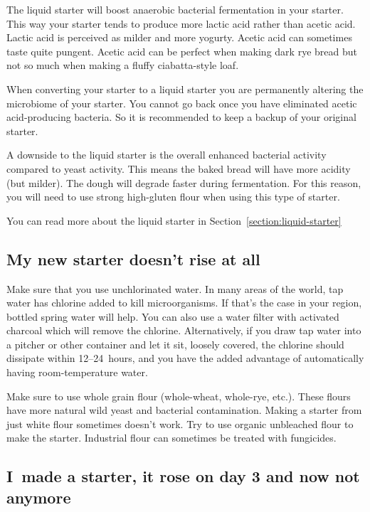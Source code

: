 The liquid starter will boost anaerobic bacterial
fermentation in your starter. This way your starter
tends to produce more lactic acid rather than acetic
acid. Lactic acid is perceived as milder and more
yogurty. Acetic acid can sometimes taste quite
pungent. Acetic acid can be perfect when making 
dark rye bread but not so much when making a fluffy
ciabatta-style loaf.

When converting your starter to a liquid starter you are
permanently altering the microbiome of your starter.
You cannot go back once you have eliminated acetic
acid-producing bacteria. So it is recommended to keep
a backup of your original starter.

A downside to the liquid starter is the overall
enhanced bacterial activity compared to yeast activity. This means the baked bread
will have more acidity (but milder). The dough will degrade
faster during fermentation. For this reason, you
will need to use strong high-gluten flour when using
this type of starter.

You can read more about the liquid starter in
Section~\ref{section:liquid-starter}

\subsection{My new starter doesn't rise at all}

Make sure that you use unchlorinated water.
In many areas of the world, tap water has
chlorine added to kill microorganisms. If that's
the case in your region, bottled spring water will
help.
You can also use a water filter with activated charcoal
which will remove the chlorine.
Alternatively, if you draw tap water into a pitcher or other
container and let it sit, loosely covered, the chlorine
should dissipate within 12--24~hours, and you have
the added advantage of automatically having
room-temperature water.

Make sure to use whole grain flour (whole-wheat, whole-rye, etc.).
These flours have more natural wild yeast and
bacterial contamination. Making a starter
from just white flour sometimes doesn't work.
Try to use organic unbleached flour to make
the starter. Industrial flour can sometimes
be treated with fungicides.

\subsection{I~made a starter, it rose on day 3 and now not anymore}

